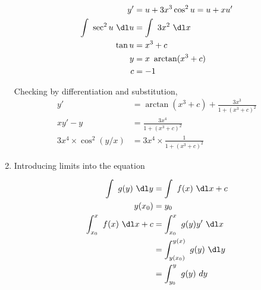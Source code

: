 \begin{enumerate}
          \begin{align}
              y'                     & = u + 3x^{3} \cos ^{2} u = u + xu' \\
              \int\ \sec^{2}u\ \dl u & = \int\ 3x^{2}\ \dl x              \\
              \tan u                 & = x^{3} + c                        \\
              y                      & = x\ \arctan (x^{3} + c)           \\
              c                      & = -1
          \end{align}
          \begin{figure}[H]
              \centering
          \end{figure}
          Checking by differentiation and substitution,
          \begin{align}
              y'      & = \arctan (x^{3} + c) + \frac{3x^{3}}
              {1 + (x^{3} + c)^{2}}                                  \\
              xy' - y & = \frac{3x^{4}}{1 + (x^{3} + c)^{2}}         \\
              3x^{4} \times \cos ^{2}(y/x)
                      & = 3x^{4} \times \frac{1}{1 + (x^{3} +c)^{2}}
          \end{align}


    \item Introducing limits into the equation

          \begin{align}
              \int\ g(y)\ \dl y                  & = \int\ f(x)\ \dl x + c             \\
              y(x_{0})                           & = y_{0}                             \\
              \int_{x_{0}}^{x}\ f(x) \ \dl x + c & = \int_{x_{0}}^{x} \ g(y) y'\ \dl x \\
                                                 & = \int_{y(x_{0})}^{y(x)} \ g(y)
              \ \dl y                                                                  \\
                                                 & = \int_{y_{0}}^{y} \ g(y)\ dy
          \end{align}



\end{enumerate}
